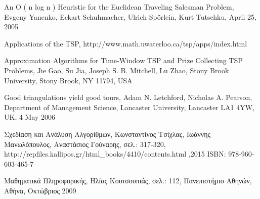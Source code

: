 \documentclass[oneside,12pt]{book}
\theoremstyle{definition}
\begin{document}
\begin{thebibliography}{depth}
	An O ( n log n ) Heuristic for the Euclidean Traveling Salesman Problem, 
	Evgeny Yanenko, Eckart
	Schuhmacher, Ulrich Spörlein, Kurt Tutschku,
	April 25, 2005
	
	Applications of the TSP,
	http://www.math.uwaterloo.ca/tsp/apps/index.html
	
	Approximation Algorithms for Time-Window
	TSP and Prize Collecting TSP Problems,
	Jie Gao, Su Jia, Joseph S. B. Mitchell, Lu Zhao,
	Stony Brook University, Stony Brook, NY 11794, USA
	
	Good triangulations yield good tours,
	Adam N. Letchford, Nicholas A. Pearson,
	Department of Management Science, Lancaster University, Lancaster LA1 4YW, UK, 
	4 May 2006

	Σχεδίαση και Ανάλυση Αλγορίθμων,
	Κωνσταντίνος Τσίχλας, Ιωάννης Μανωλόπουλος, Αναστάσιος Γούναρης,
	σελ.: 317-320,
	http://repfiles.kallipos.gr/html\_books/4410/contents.html ,2015
	ISBN: 978-960-603-465-7
	
	Μαθηματικά Πληροφορικής,
	Ηλίας Κουτσουπιάς,
	σελ.: 112,
	Πανεπιστήμιο Αθηνών, Αθήνα, Οκτώβριος 2009
	
\end{thebibliography}
\end{document}
